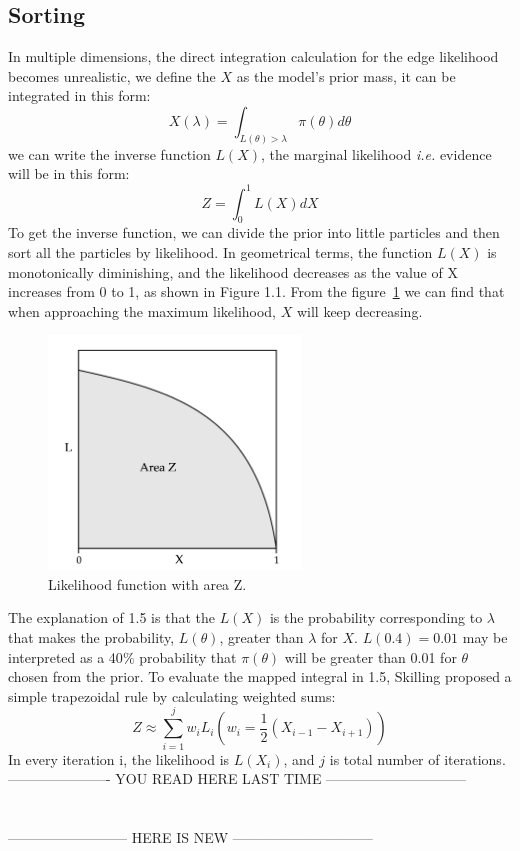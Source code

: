 \documentclass[11pt]{book}
\begin{document}
\subsection{Sorting}
In multiple dimensions, the direct integration calculation for the edge likelihood becomes unrealistic, we define the 
 $X$ as the model's prior mass, it can be integrated in this form:
 \begin{equation}
	X(\lambda) = \int _{L(\theta)> \lambda}\pi(\theta)d\theta
 \end{equation}
 we can write the inverse function $L(X)$, the marginal likelihood \textit{i.e.} evidence will
 be in this form:
 \begin{equation}
	 Z = \int ^{1}_{0} L(X) dX
 \end{equation}
 To get the inverse function, we can divide the prior into little particles and then sort all the particles by likelihood.
 In geometrical terms, the function $L(X)$ is monotonically diminishing, and the likelihood decreases as the value of X increases from 0 to 1, as shown in Figure 1.1.
From the figure~\ref{fig:modes} we can find that when approaching the maximum likelihood, $X$ will keep decreasing.
 \begin{center}
	\begin{figure}
			\centering
			\includegraphics[width=0.6\textwidth]{areaz}
			\caption{Likelihood function with area Z.}
			\label{fig:modes}
	\end{figure}
	\end{center}

The explanation of 1.5 is that the $L(X)$ is the probability corresponding to $\lambda$ that makes the probability, $L(\theta)$, greater than $\lambda$ for $X$. 
$L(0.4) = 0.01$ may be interpreted as a 40$\%$ probability that $\pi(\theta)$ will be greater than 0.01 for $\theta$ chosen from the prior.
To evaluate the mapped integral in 1.5, Skilling proposed a simple trapezoidal rule by calculating 
weighted sums:
\begin{equation}
	Z \approx \sum_{i=1}^{j}w_iL_i (w_i = \frac{1}{2}(X_{i-1} -X_{i+1}))
\end{equation}
In every iteration i, the likelihood is $L(X_i)$, and $j$ is total number of iterations.
\\
---------------------- YOU READ HERE LAST TIME ------------------------------ \\
\\
\\
-------------------------- HERE IS NEW ------------------------------ \\
\\
\end{document}
